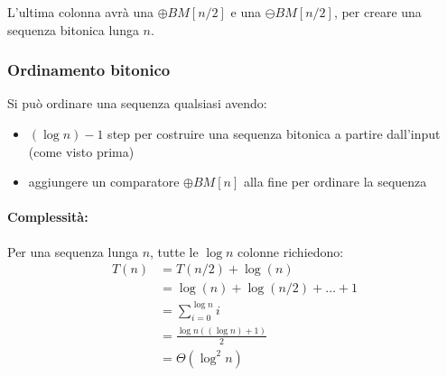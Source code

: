L'ultima colonna avrà una $\oplus BM [n/2]$ e una $\ominus BM [n/2]$, per creare una sequenza bitonica lunga $n$.

\subsubsection{Ordinamento bitonico}

Si può ordinare una sequenza qualsiasi avendo: 
\begin{itemize}
    \item $(\log n) - 1$ step per costruire una sequenza bitonica a partire dall'input (come visto prima)
    
    \item aggiungere un comparatore $\oplus BM [n]$ alla fine per ordinare la sequenza
\end{itemize}

\paragraph{Complessità:} Per una sequenza lunga $n$, tutte le $\log n$ colonne richiedono: 
\begin{align*}
    T(n) & = T(n/2) + \log (n) \\
    & = \log (n) + \log (n/2) + \dots + 1 \\
    & = \sum_{i=0}^{\log n} i \\
    & = \frac{\log n \left((\log n) + 1\right)}{2} \\
    & = \Theta (\log^2 n) 
\end{align*}


